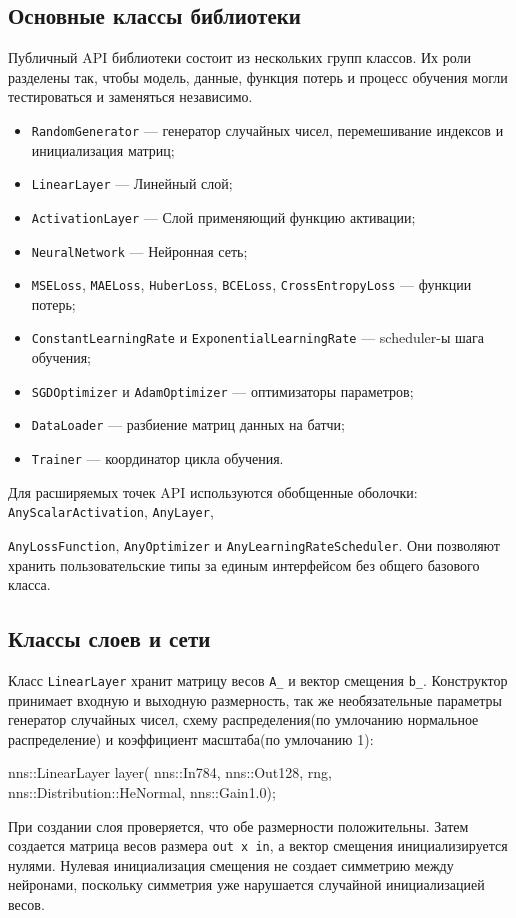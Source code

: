 \documentclass{article}
\begin{document}
\subsection{Основные классы библиотеки}

Публичный API библиотеки состоит из нескольких групп классов. Их роли
разделены так, чтобы модель, данные, функция потерь и процесс обучения
могли тестироваться и заменяться независимо.

\begin{itemize}
    \item \texttt{RandomGenerator} --- генератор случайных чисел,
        перемешивание индексов и инициализация матриц;
    \item \texttt{LinearLayer} --- Линейный слой;
    \item \texttt{ActivationLayer} --- Слой применяющий функцию активации;
    \item \texttt{NeuralNetwork} --- Нейронная сеть;
    \item \texttt{MSELoss}, \texttt{MAELoss}, \texttt{HuberLoss},
        \texttt{BCELoss}, \texttt{CrossEntropyLoss} ---
        функции потерь;
    \item \texttt{ConstantLearningRate} и
        \texttt{ExponentialLearningRate} --- scheduler-ы шага
        обучения;
    \item \texttt{SGDOptimizer} и \texttt{AdamOptimizer} ---
        оптимизаторы параметров;
    \item \texttt{DataLoader} --- разбиение матриц данных на батчи;
    \item \texttt{Trainer} --- координатор цикла обучения.
\end{itemize}

Для расширяемых точек API используются обобщенные оболочки:
\texttt{AnyScalarActivation}, \texttt{AnyLayer},

\texttt{AnyLossFunction}, \texttt{AnyOptimizer} и
\texttt{AnyLearningRateScheduler}. Они позволяют хранить
пользовательские типы за единым интерфейсом без общего
базового класса.

\subsection{Классы слоев и сети}

Класс \texttt{LinearLayer} хранит матрицу весов \texttt{A\_} и вектор смещения \texttt{b\_}.
Конструктор принимает входную и выходную размерность, так же необязательные параметры
генератор случайных чисел, схему распределения(по умлочанию нормальное распределение) и коэффициент масштаба(по умлочанию 1):
\begin{cppcode}
nns::LinearLayer layer(
    nns::In{784},
    nns::Out{128},
    rng,
    nns::Distribution::HeNormal,
    nns::Gain{1.0});
\end{cppcode}
При создании слоя проверяется, что обе размерности положительны. Затем
создается матрица весов размера \texttt{out x in}, а вектор смещения
инициализируется нулями. Нулевая инициализация смещения не создает
симметрию между нейронами, поскольку симметрия уже нарушается
случайной инициализацией весов.
\end{document}
